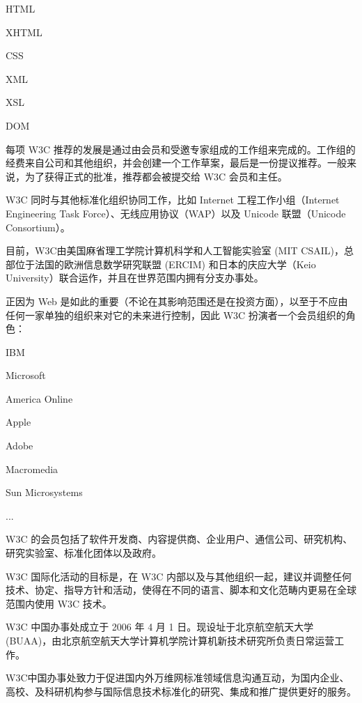 \begin{compactitem}
\item HTML
\item XHTML
\item CSS
\item XML
\item XSL
\item DOM
\end{compactitem}

每项 W3C 推荐的发展是通过由会员和受邀专家组成的工作组来完成的。工作组的经费来自公司和其他组织，并会创建一个工作草案，最后是一份提议推荐。一般来说，为了获得正式的批准，推荐都会被提交给 W3C 会员和主任。

W3C 同时与其他标准化组织协同工作，比如 Internet 工程工作小组（Internet Engineering Task Force）、无线应用协议（WAP）以及 Unicode 联盟（Unicode Consortium）。

目前，W3C由美国麻省理工学院计算机科学和人工智能实验室 (MIT CSAIL)，总部位于法国的欧洲信息数学研究联盟 (ERCIM) 和日本的庆应大学（Keio University）联合运作，并且在世界范围内拥有分支办事处。

正因为 Web 是如此的重要（不论在其影响范围还是在投资方面），以至于不应由任何一家单独的组织来对它的未来进行控制，因此 W3C 扮演者一个会员组织的角色：

\begin{compactitem}
\item IBM
\item Microsoft
\item America Online
\item Apple
\item Adobe
\item Macromedia
\item Sun Microsystems
\item ...
\end{compactitem}

W3C 的会员包括了软件开发商、内容提供商、企业用户、通信公司、研究机构、研究实验室、标准化团体以及政府。

W3C 国际化活动的目标是，在 W3C 内部以及与其他组织一起，建议并调整任何技术、协定、指导方针和活动，使得在不同的语言、脚本和文化范畴内更易在全球范围内使用 W3C 技术。


W3C 中国办事处成立于 2006 年 4 月 1 日。现设址于北京航空航天大学(BUAA)，由北京航空航天大学计算机学院计算机新技术研究所负责日常运营工作。

W3C中国办事处致力于促进国内外万维网标准领域信息沟通互动，为国内企业、高校、及科研机构参与国际信息技术标准化的研究、集成和推广提供更好的服务。

